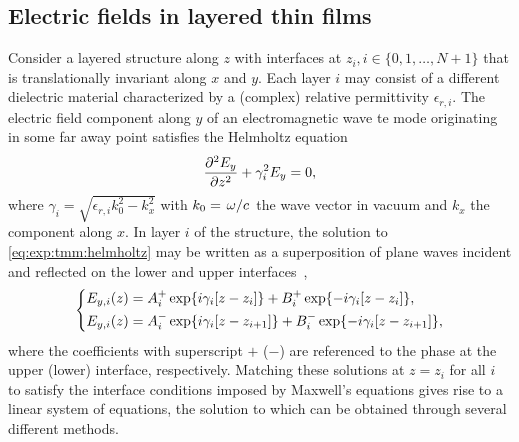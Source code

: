 \subsection{Electric fields in layered thin films}\label{subsec:exp:tmm:theory}
Consider a layered structure along $z$ with interfaces at $z_i, i\in\lbrace 0, 1, \dotsc, N+1\rbrace$ that is translationally invariant along $x$ and $y$.
Each layer $i$ may consist of a different dielectric material characterized by a (complex) relative permittivity $\epsilon_{r,i}$.
The electric field component along $y$ of an electromagnetic wave \gls{te} mode originating in some far away point satisfies the Helmholtz equation
\begin{equation}\label{eq:exp:tmm:helmholtz}
    \pdv[2]{E_y}{z} + \gamma_i^2 E_y = 0,
\end{equation}
where $\gamma_i = \sqrt{\epsilon_{r,i}k_0^2 - k_x^2}$ with $k_0=\flatfrac{\omega}{c}$ the wave vector in vacuum and $k_x$ the component along $x$.
In layer $i$ of the structure, the solution to \cref{eq:exp:tmm:helmholtz} may be written as a superposition of plane waves incident and reflected on the lower and upper interfaces~\cite{Langevin2024},
\begin{equation}\label{eq:exp:tmm:fields}
    \begin{dcases}
        E_{y,i}(z) = A_i^{+}\exp{\ensuremath{i}\gamma_i[z-z_{i}]} + B_i^{+}\exp{-\ensuremath{i}\gamma_i[z-z_{i}]}, \\
        E_{y,i}(z) = A_i^{-}\exp{\ensuremath{i}\gamma_i[z-z_{i+1}]} + B_i^{-}\exp{-\ensuremath{i}\gamma_i[z-z_{i+1}]},
    \end{dcases}
\end{equation}
where the coefficients with superscript $+$ ($-$) are referenced to the phase at the upper (lower) interface, respectively.
Matching these solutions at $z=z_i$ for all $i$ to satisfy the interface conditions imposed by Maxwell's equations gives rise to a linear system of equations, the solution to which can be obtained through several different methods.


